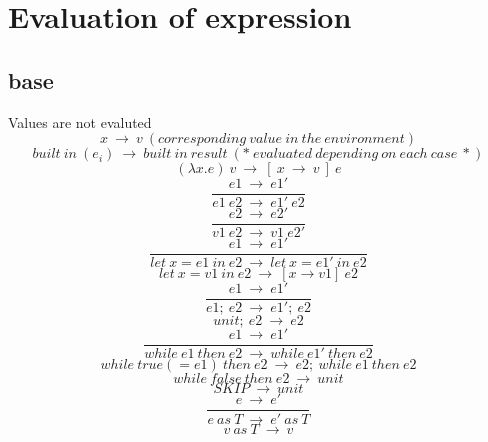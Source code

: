 \documentclass[10pt,a4paper]{article}
\begin{document}
\section*{ Evaluation of expression }

\subsection*{ base }
Values are not evaluted
\begin{equation}x\ \rightarrow \ v\ (corresponding\ value\ in\ the\ environment)\ \tag{\ E-VARIABLE\ }\end{equation}
\begin{equation}built\ in\ (e_i)\ \rightarrow \ built\ in\ result                           \ (*\ evaluated\ depending\ on\ each\ case\ *)\ \tag{\ E-BUILTIN\ }\end{equation}
\begin{equation}(\lambda x.e)\ v\ \rightarrow \ [\ x\ \rightarrow \ v\ ]\ e\ \tag{\ E-LAMBDA\ }\end{equation}
\begin{equation}\frac{e1\ \rightarrow \ e1'}{e1\ e2\ \rightarrow \ e1'\ e2}\ \tag{\ E-APP1\ }\end{equation}
\begin{equation}\frac{e2\ \rightarrow \ e2'}{v1\ e2\ \rightarrow \ v1\ e2'}\ \tag{\ E-APP2\ }\end{equation}
\begin{equation}\frac{e1\ \rightarrow \ e1'}{let\ x=e1\ in\ e2\ \rightarrow \ let\ x=e1'\ in\ e2}\ \tag{\ E-LET\ }\end{equation}
\begin{equation}let\ x=v1\ in\ e2\ \rightarrow \ [x\rightarrow v1]\ e2\ \tag{\ E-LETIN\ }\end{equation} 
\begin{equation}\frac{e1\ \rightarrow \ e1'}{e1;\ e2\ \rightarrow \ e1';\ e2}\ \tag{\ E-SEQ\ }\end{equation}
\begin{equation}unit;\ e2\ \rightarrow \ e2\ \tag{\ E-SEQNEXT\ }\end{equation}
\begin{equation}\frac{e1\ \rightarrow \ e1'}{while\ e1\ then\ e2\ \rightarrow \ while\ e1'\ then\ e2}\ \tag{\ E-LOOP\ }\end{equation}
\begin{equation}while\ true(=e1)\ then\ e2\ \rightarrow \ e2;\ while\ e1\ then\ e2\ \tag{\ E-LOOPTRUE\ }\end{equation}
\begin{equation}while\ false\ then\ e2\ \rightarrow \ unit\ \tag{\ E-LOOPFALSE\ }\end{equation}
\begin{equation}SKIP\ \rightarrow \ unit\ \tag{\ E-SKIP\ }\end{equation}
\begin{equation}\frac{e\ \rightarrow \ e'}{e\ as\ T\ \rightarrow \ e'\ as\ T}\ \tag{\ E-ASCR1\ }\end{equation}
\begin{equation}v\ as\ T \ \rightarrow \ v\ \tag{\ E-ASCR2\ }\end{equation}  
\end{document}

